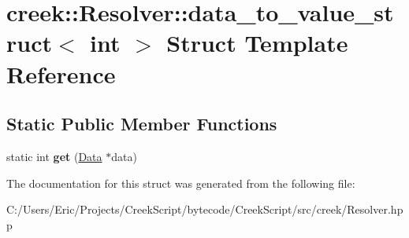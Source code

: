 \hypertarget{structcreek_1_1_resolver_1_1data__to__value__struct_3_01int_01_4}{}\section{creek\+:\+:Resolver\+:\+:data\+\_\+to\+\_\+value\+\_\+struct$<$ int $>$ Struct Template Reference}
\label{structcreek_1_1_resolver_1_1data__to__value__struct_3_01int_01_4}
\subsection*{Static Public Member Functions}
\begin{DoxyCompactItemize}
\item 
static int {\bfseries get} (\hyperlink{classcreek_1_1_data}{Data} $\ast$data)\hypertarget{structcreek_1_1_resolver_1_1data__to__value__struct_3_01int_01_4_a5d00fb70d8a05df69e7aaec8b14bebff}{}\label{structcreek_1_1_resolver_1_1data__to__value__struct_3_01int_01_4_a5d00fb70d8a05df69e7aaec8b14bebff}

\end{DoxyCompactItemize}


The documentation for this struct was generated from the following file\+:\begin{DoxyCompactItemize}
\item 
C\+:/\+Users/\+Eric/\+Projects/\+Creek\+Script/bytecode/\+Creek\+Script/src/creek/Resolver.\+hpp\end{DoxyCompactItemize}
